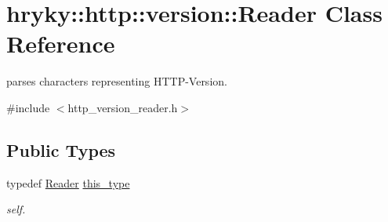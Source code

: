 \hypertarget{classhryky_1_1http_1_1version_1_1_reader}{\section{hryky\-:\-:http\-:\-:version\-:\-:Reader Class Reference}
\label{classhryky_1_1http_1_1version_1_1_reader}
}


parses characters representing H\-T\-T\-P-\/\-Version.  




{\ttfamily \#include $<$http\-\_\-version\-\_\-reader.\-h$>$}

\subsection*{Public Types}
\begin{DoxyCompactItemize}
\item 
\hypertarget{classhryky_1_1http_1_1version_1_1_reader_a75064c5aa31f02adcbdd0b6b255c5a73}{typedef \hyperlink{classhryky_1_1http_1_1version_1_1_reader}{Reader} \hyperlink{classhryky_1_1http_1_1version_1_1_reader_a75064c5aa31f02adcbdd0b6b255c5a73}{this\-\_\-type}}\label{classhryky_1_1http_1_1version_1_1_reader_a75064c5aa31f02adcbdd0b6b255c5a73}

\begin{DoxyCompactList}\small\item\em self. \end{DoxyCompactList}\end{DoxyCompactItemize}
